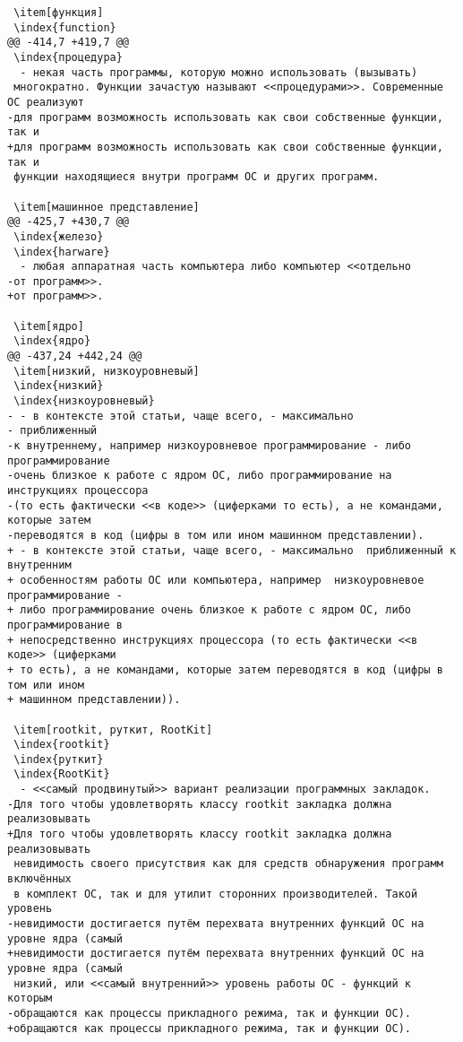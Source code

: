 \begin{verbatim}
 \item[функция]
 \index{function}
@@ -414,7 +419,7 @@
 \index{процедура}
  - некая часть программы, которую можно использовать (вызывать)
 многократно. Функции зачастую называют <<процедурами>>. Современные ОС реализуют
-для программ возможность использовать как свои собственные функции, так и
+для программ возможность использовать как свои собственные функции, так и
 функции находящиеся внутри программ ОС и других программ.

 \item[машинное представление]
@@ -425,7 +430,7 @@
 \index{железо}
 \index{harware}
  - любая аппаратная часть компьютера либо компьютер <<отдельно
-от программ>>.
+от программ>>.

 \item[ядро]
 \index{ядро}
@@ -437,24 +442,24 @@
 \item[низкий, низкоуровневый]
 \index{низкий}
 \index{низкоуровневый}
- - в контексте этой статьи, чаще всего, - максимально
- приближенный
-к внутреннему, например низкоуровневое программирование - либо программирование
-очень близкое к работе с ядром ОС, либо программирование на инструкциях процессора
-(то есть фактически <<в коде>> (циферками то есть), а не командами, которые затем
-переводятся в код (цифры в том или ином машинном представлении).
+ - в контексте этой статьи, чаще всего, - максимально  приближенный к внутренним
+ особенностям работы ОС или компьютера, например  низкоуровневое программирование -
+ либо программирование очень близкое к работе с ядром ОС, либо программирование в
+ непосредственно инструкциях процессора (то есть фактически <<в коде>> (циферками
+ то есть), а не командами, которые затем переводятся в код (цифры в том или ином
+ машинном представлении)).

 \item[rootkit, руткит, RootKit]
 \index{rootkit}
 \index{руткит}
 \index{RootKit}
  - <<самый продвинутый>> вариант реализации программных закладок.
-Для того чтобы удовлетворять классу rootkit закладка должна реализовывать
+Для того чтобы удовлетворять классу rootkit закладка должна реализовывать
 невидимость своего присутствия как для средств обнаружения программ включённых
 в комплект ОС, так и для утилит сторонних производителей. Такой уровень
-невидимости достигается путём перехвата внутренних функций ОС на уровне ядра (самый
+невидимости достигается путём перехвата внутренних функций ОС на уровне ядра (самый
 низкий, или <<самый внутренний>> уровень работы ОС - функций к которым
-обращаются как процессы прикладного режима, так и функции ОС).
+обращаются как процессы прикладного режима, так и функции ОС).


\end{verbatim}
